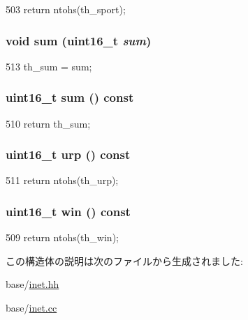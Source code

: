 \begin{DoxyCode}
503 { return ntohs(th_sport); }
\end{DoxyCode}
\hypertarget{structNet_1_1TcpHdr_ae0171ec0578adacce8cceb6a804f97f1}{
\subsubsection[{sum}]{\setlength{\rightskip}{0pt plus 5cm}void sum (uint16\_\-t {\em sum})}}
\label{structNet_1_1TcpHdr_ae0171ec0578adacce8cceb6a804f97f1}



\begin{DoxyCode}
513 { th_sum = sum; }
\end{DoxyCode}
\hypertarget{structNet_1_1TcpHdr_acbf3c502c7393ef0178454b237b2562f}{
\subsubsection[{sum}]{\setlength{\rightskip}{0pt plus 5cm}uint16\_\-t sum () const}}
\label{structNet_1_1TcpHdr_acbf3c502c7393ef0178454b237b2562f}



\begin{DoxyCode}
510 { return th_sum; }
\end{DoxyCode}
\hypertarget{structNet_1_1TcpHdr_ad713d66036461e2df776046f5f0a6fd1}{
\subsubsection[{urp}]{\setlength{\rightskip}{0pt plus 5cm}uint16\_\-t urp () const}}
\label{structNet_1_1TcpHdr_ad713d66036461e2df776046f5f0a6fd1}



\begin{DoxyCode}
511 { return ntohs(th_urp); }
\end{DoxyCode}
\hypertarget{structNet_1_1TcpHdr_aada963d6f2ef1f4802bfe71a346bdc5e}{
\subsubsection[{win}]{\setlength{\rightskip}{0pt plus 5cm}uint16\_\-t win () const}}
\label{structNet_1_1TcpHdr_aada963d6f2ef1f4802bfe71a346bdc5e}



\begin{DoxyCode}
509 { return ntohs(th_win); }
\end{DoxyCode}


この構造体の説明は次のファイルから生成されました:\begin{DoxyCompactItemize}
\item 
base/\hyperlink{inet_8hh}{inet.hh}\item 
base/\hyperlink{inet_8cc}{inet.cc}\end{DoxyCompactItemize}
